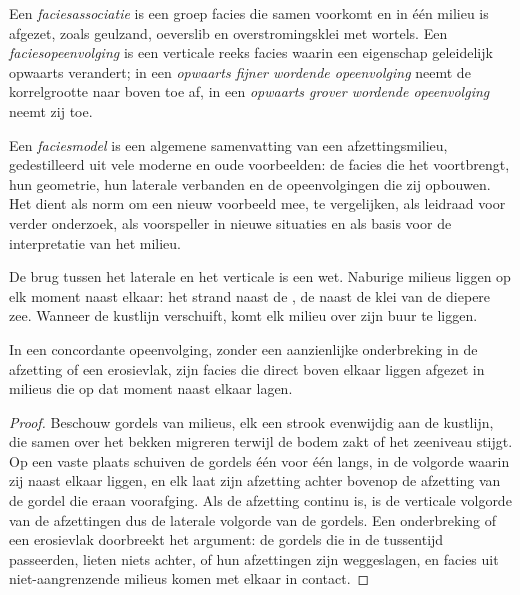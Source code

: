 \begin{definition}\label{def:b3:facies-models:association}
Een \emph{faciesassociatie} is een groep facies die
samen voorkomt en in één milieu is afgezet, zoals
geulzand, oeverslib en overstromingsklei met wortels. Een \emph{faciesopeenvolging}
is een verticale reeks facies waarin
een eigenschap geleidelijk opwaarts verandert; in een \emph{opwaarts fijner
wordende opeenvolging} neemt de korrelgrootte naar boven toe af,
in een \emph{opwaarts grover wordende opeenvolging}
neemt zij toe.
\end{definition}

\begin{definition}[Faciesmodel]\label{def:b3:facies-models:model}
Een \emph{faciesmodel} is een algemene samenvatting van een
afzettingsmilieu, gedestilleerd uit vele moderne en oude voorbeelden: de
facies die het voortbrengt, hun geometrie, hun laterale verbanden en de
opeenvolgingen die zij opbouwen. Het dient als norm om een nieuw voorbeeld mee,
te vergelijken, als leidraad voor verder onderzoek, als voorspeller in nieuwe situaties en als basis voor
de interpretatie van het milieu.
\end{definition}

De brug tussen het laterale en het verticale is een wet. Naburige milieus
liggen op elk moment naast elkaar: het strand naast de , de
 naast de klei van de diepere zee. Wanneer de kustlijn
verschuift, komt elk milieu over zijn buur te liggen.

\begin{theorem}\label{thm:b3:facies-models:walther}
In een concordante opeenvolging, zonder een aanzienlijke onderbreking in de afzetting of een
erosievlak, zijn facies die direct boven elkaar liggen afgezet in
milieus die op dat moment naast elkaar lagen.
\end{theorem}

\begin{proof}
Beschouw gordels van milieus, elk een strook evenwijdig aan de kustlijn, die
samen over het bekken migreren terwijl de bodem zakt of het zeeniveau
stijgt. Op een vaste plaats schuiven de gordels één voor één langs, in de volgorde
waarin zij naast elkaar liggen, en elk laat zijn afzetting achter bovenop de
afzetting van de gordel die eraan voorafging. Als de afzetting continu is, is
de verticale volgorde van de afzettingen dus de laterale volgorde van de
gordels. Een onderbreking of een erosievlak doorbreekt het argument: de gordels die
in de tussentijd passeerden, lieten niets achter, of hun afzettingen zijn weggeslagen, en facies uit
niet-aangrenzende milieus komen met elkaar in contact.
\end{proof}


